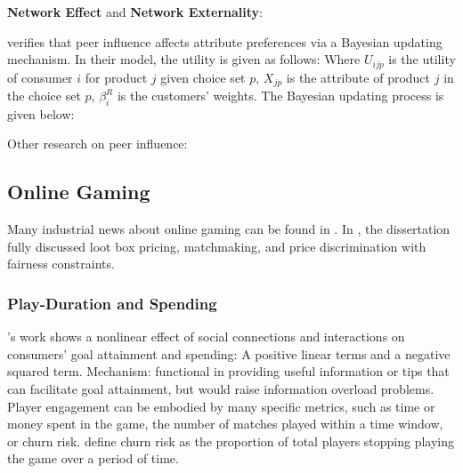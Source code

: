 \documentclass[12pt]{report}
\begin{document}
\textbf{Network Effect} and \textbf{Network Externality}:

\cite{Narayan2011} verifies that peer influence affects attribute preferences via a Bayesian updating mechanism. In
their model, the utility is given as follows:
Where $U_{ijp}$ is the utility of consumer $i$ for product $j$ given choice set $p$, $X_{jp}$ is the attribute of
product $j$ in the choice set $p$, $\beta_i^R$ is the customers' weights. The Bayesian updating process is given below:

Other research on peer influence:

\subsection{Online Gaming}

Many industrial news about online gaming can be found in \cite{Chen2017}.
In \cite{lei2022revenue}, the dissertation fully discussed loot box pricing, matchmaking, and
price discrimination with fairness constraints.

\subsubsection{Play-Duration and Spending}

\cite{Zhang2017}'s work shows a nonlinear effect of social connections and interactions
on consumers’ goal attainment and spending: A positive linear terms and a negative squared term. Mechanism:
functional in providing useful information or tips that can facilitate goal attainment,
but would raise information overload problems.\\

Player engagement can be embodied by many specific metrics, such as time or money
spent in the game, the number of matches played within a time window, or churn risk.
\cite{Chen2017} define churn risk as the proportion of total players stopping playing the game over a period of time.
\end{document}
